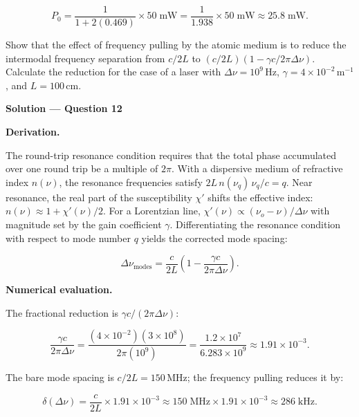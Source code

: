 \begin{equation*}
  P_0 = \frac{1}{1 + 2(0.469)} \times 50\;\text{mW} = \frac{1}{1.938} \times 50\;\text{mW} \approx \boxed{25.8\;\text{mW}.}
\end{equation*}


\begin{question}[Question 12]Show that the effect of frequency pulling by the atomic medium is to
reduce the intermodal frequency separation from $c/2L$ to
$(c/2L)(1-\gamma c/2\pi\Delta\nu)$.
Calculate the reduction for the case of a laser with $\Delta\nu=10^{9}$\,Hz,
$\gamma=4\times10^{-2}$\,m$^{-1}$, and $L=100$\,cm.
\end{question}

\textbf{\large Solution --- Question 12}

\textbf{Derivation.}

The round-trip resonance condition requires that the total phase accumulated over one round trip be a multiple of $2\pi$. With a dispersive medium of refractive index $n(\nu)$, the resonance frequencies satisfy $2L\,n(\nu_q)\,\nu_q/c = q$. Near resonance, the real part of the susceptibility $\chi'$ shifts the effective index: $n(\nu) \approx 1 + \chi'(\nu)/2$. For a Lorentzian line, $\chi'(\nu) \propto (\nu_o - \nu)/\Delta\nu$ with magnitude set by the gain coefficient $\gamma$. Differentiating the resonance condition with respect to mode number $q$ yields the corrected mode spacing:

\begin{equation*}
  \Delta\nu_{\text{modes}} = \frac{c}{2L}\left(1 - \frac{\gamma c}{2\pi\Delta\nu}\right).
\end{equation*}

\textbf{Numerical evaluation.}

The fractional reduction is $\gamma c/(2\pi\Delta\nu)$:

\begin{equation*}
  \frac{\gamma c}{2\pi\Delta\nu} = \frac{(4\times10^{-2})(3\times10^{8})}{2\pi(10^{9})} = \frac{1.2\times10^{7}}{6.283\times10^{9}} \approx 1.91\times10^{-3}.
\end{equation*}

The bare mode spacing is $c/2L = 150$\,MHz; the frequency pulling reduces it by:

\begin{equation*}
  \boxed{\delta(\Delta\nu) = \frac{c}{2L} \times 1.91\times10^{-3} \approx 150\;\text{MHz} \times 1.91\times10^{-3} \approx 286\;\text{kHz}.}
\end{equation*}

